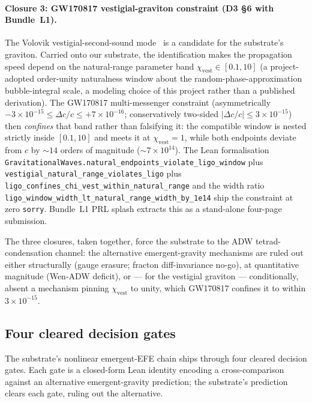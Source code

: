\documentclass[aps,prd,reprint,nofootinbib,superscriptaddress]{revtex4-2}
\begin{document}
\paragraph{Closure 3: GW170817 vestigial-graviton constraint (D3
\S 6 with Bundle~L1).} The Volovik vestigial-second-sound
mode~\cite{Volovik2024Vestigial} is a candidate for the substrate's
graviton. Carried onto our substrate, the identification makes the
propagation speed depend on the natural-range parameter band
$\chi_{\mathrm{vest}}\in[0.1,10]$ (a project-adopted order-unity
naturalness window about the random-phase-approximation
bubble-integral scale, a modeling choice of this project rather than
a published derivation). The
GW170817 multi-messenger constraint (asymmetrically
$-3\times 10^{-15} \le \Delta c/c \le +7\times 10^{-16}$;
conservatively two-sided $|\Delta c/c| \le 3\times
10^{-15}$)~\cite{Abbott2017GW170817} then \emph{confines} that band
rather than falsifying it: the compatible window is nested strictly
inside $[0.1,10]$ and meets it at $\chi_{\mathrm{vest}} = 1$, while
both endpoints deviate from $c$ by $\sim 14$ orders of magnitude
($\sim 7\times 10^{14}$). The Lean
formalisation \texttt{GravitationalWaves.natural\_endpoints\_violate\_ligo\_window}
plus \texttt{vestigial\_natural\_range\_violates\_ligo} plus
\texttt{ligo\_confines\_chi\_vest\_within\_natural\_range} and the
width ratio
\texttt{ligo\_window\_width\_lt\_natural\_range\_width\_by\_1e14}
ship the constraint at zero \texttt{sorry}. Bundle~L1 PRL splash
extracts this as a stand-alone four-page submission.

The three closures, taken together, force the substrate to the ADW
tetrad-condensation channel: the alternative emergent-gravity
mechanisms are ruled out either structurally (gauge erasure;
fracton diff-invariance no-go), at quantitative magnitude (Wen-ADW
deficit), or --- for the vestigial graviton --- conditionally, absent
a mechanism pinning $\chi_{\mathrm{vest}}$ to unity, which GW170817
confines it to within $3\times 10^{-15}$.

\subsection{Four cleared decision gates}

The substrate's nonlinear emergent-EFE chain ships through four
cleared decision gates. Each gate is a closed-form Lean identity
encoding a cross-comparison against an alternative emergent-gravity
prediction; the substrate's prediction clears each gate, ruling out
the alternative.
\end{document}
